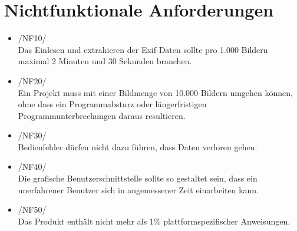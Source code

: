 \section{Nichtfunktionale Anforderungen}

\begin{itemize}
	\item /NF10/\\Das Einlesen und extrahieren der Exif-Daten sollte pro 1.000 Bildern maximal 2 Minuten und 30 Sekunden brauchen.
	\item /NF20/\\Ein Projekt muss mit einer Bildmenge von 10.000 Bildern umgehen können, ohne dass ein Programmabsturz oder längerfristigen Programmunterbrechungen daraus resultieren.
	\item /NF30/\\Bedienfehler dürfen nicht dazu führen, dass Daten verloren gehen.
	\item /NF40/\\Die grafische Benutzerschnittstelle sollte so gestaltet sein, dass ein unerfahrener Benutzer sich in angemessener Zeit einarbeiten kann.
	\item /NF50/\\Das Produkt enthält nicht mehr als 1\% plattformspezifischer Anweisungen.
\end{itemize}
